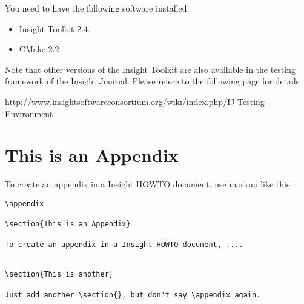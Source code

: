 \documentclass{InsightArticle}
\begin{document}
You need to have the following software installed:

\begin{itemize}
  \item  Insight Toolkit 2.4.
  \item  CMake 2.2
\end{itemize}

Note that other versions of the Insight Toolkit are also available in the
testing framework of the Insight Journal. Please refere to the following page
for details

\url{http://www.insightsoftwareconsortium.org/wiki/index.php/IJ-Testing-Environment}





\appendix

\section{This is an Appendix}

To create an appendix in a Insight HOWTO document, use markup like
this:

\begin{verbatim}
\appendix

\section{This is an Appendix}

To create an appendix in a Insight HOWTO document, ....


\section{This is another}

Just add another \section{}, but don't say \appendix again.
\end{verbatim}
\end{document}
